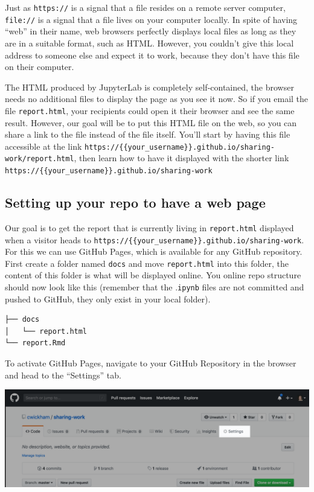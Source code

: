 \documentclass[]{Nemilov}
\begin{document}
Just as \texttt{https://} is a signal that a file resides on a remote server computer,
\texttt{file://} is a signal that a file lives on your computer locally.
In spite of having ``web'' in their name,
web browsers perfectly displays local files as long as they are in a suitable format,
such as HTML.
However,
you couldn't give this local address to someone else and expect it to work,
because they don't have this file on their computer.

The HTML produced by JupyterLab is completely self-contained,
the browser needs no additional files to display the page as you see it now.
So if you email the file \texttt{report.html},
your recipients could open it their browser and see the same result.
However,
our goal will be to put this HTML file on the web,
so you can share a link to the file instead of the file itself.
You'll start by having this file accessible at the link \texttt{https://\{\{your\_username\}\}.github.io/sharing-work/report.html},
then learn how to have it displayed with the shorter link \texttt{https://\{\{your\_username\}\}.github.io/sharing-work}

\hypertarget{setting-up-your-repo-to-have-a-web-page}{%
\subsection{Setting up your repo to have a web page}\label{setting-up-your-repo-to-have-a-web-page}}

Our goal is to get the report that is currently living in \texttt{report.html} displayed
when a visitor heads to \texttt{https://\{\{your\_username\}\}.github.io/sharing-work}.
For this we can use GitHub Pages, which is available for any GitHub repository.
First create a folder named \texttt{docs} and move \texttt{report.html} into this folder,
the content of this folder is what will be displayed online.
You online repo structure should now look like this
(remember that the .\texttt{ipynb} files are not committed and pushed to GitHub,
they only exist in your local folder).

\begin{verbatim}
├── docs
│   └── report.html
└── report.Rmd
\end{verbatim}

To activate GitHub Pages, navigate to your GitHub Repository in the browser
and head to the ``Settings'' tab.

\includegraphics{figures/r-publishing/github-settings.png}
\end{document}
